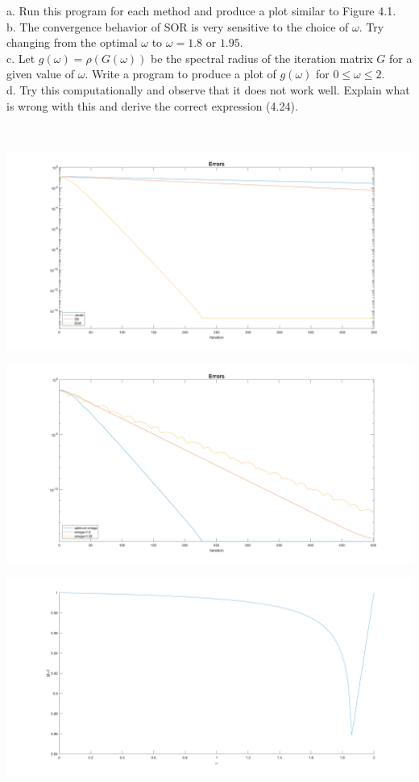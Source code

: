 a. Run this program for each method and produce a plot similar to Figure 4.1.\\
b. The convergence behavior of SOR is very sensitive to the choice of $\omega$. Try changing from the
optimal $\omega$ to $\omega=1.8$ or $1.95$.\\
c. Let $g(\omega)=\rho(G(\omega))$ be the spectral radius of the iteration matrix $G$ for a given value
of $\omega$. Write a program to produce a plot of $g(\omega)$ for $0\leq\omega\leq2$.\\
d. Try this computationally and observe that it does not work well. Explain what is wrong with this and
derive the correct expression (4.24).\\

\begin{solution}\renewcommand{\qedsymbol}{}\ \\ 
    \begin{center}
        \includegraphics[scale=0.15]{vs.PNG}
    \end{center}
    \begin{center}
        \includegraphics[scale=0.15]{omega.PNG}
    \end{center}
    \begin{center}
        \includegraphics[scale=0.15]{omegaiter.PNG}
    \end{center}


\end{solution}
